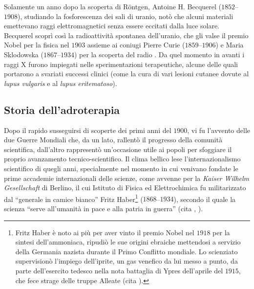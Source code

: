 \documentclass[12pt,a4paper,twoside]{report}
\begin{document}
	Solamente un anno dopo la scoperta di Röntgen, Antoine H. Becquerel ($1852$--$1908$), studiando la fosforescenza dei sali di uranio, notò che alcuni materiali emettevano raggi elettromagnetici senza essere eccitati dalla luce solare. Becquerel scoprì così la radioattività spontanea dell'uranio, che gli valse il premio Nobel per la fisica nel $1903$ assieme ai coniugi Pierre Curie ($1859$--$1906$) e Maria Sklodowska ($1867$--$1934$) per la scoperta del radio . Da quel momento in avanti i raggi X furono impiegati nelle sperimentazioni terapeutiche, alcune delle quali portarono a svariati successi clinici (come la cura di vari lesioni cutanee dovute al \textit{lupus vulgaris} e al \textit{lupus eritematoso}).
	
	\subsection{Storia dell'adroterapia}\label{storia_adroterapia}
	Dopo il rapido susseguirsi di scoperte dei primi anni del $1900$, vi fu l'avvento delle due Guerre Mondiali che, da un lato, rallentò il progresso della comunità scientifica, dall'altro rappresentò un'occasione utile ai popoli per sfoggiare il proprio avanzamento tecnico-scientifico. Il clima bellico lese l'internazionalismo scientifico di quegli anni, specialmente nel momento in cui venivano fondate le prime accademie internazionali delle scienze, come avvenne per la \textit{Kaiser Wilhelm Gesellschaft} di Berlino, il cui Istituto di Fisica ed Elettrochimica fu militarizzato dal ``generale in camice bianco'' Fritz Haber\footnote{Fritz Haber è noto ai più per aver vinto il premio Nobel nel $1918$ per la sintesi dell'ammoniaca, ripudiò le sue origini ebraiche mettendosi a servizio della Germania nazista durante il Primo Conflitto mondiale. Lo scienziato supervisionò l'impiego dell'iprite, un gas venefico da lui messo a punto, da parte dell'esercito tedesco nella nota battaglia di Ypres dell’aprile del $1915$, che fece strage delle truppe Alleate (cita
		).} ($1868$--$1934$), secondo il quale la scienza ``serve all’umanità in pace e alla patria in guerra'' (cita
	,
	).
	
\end{document}
